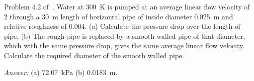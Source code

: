
\begin{question}
	Problem 4.2 of~\cite{gaskell}. Water at \SI{300}{\kelvin} is pumped at an average linear flow velocity of \SI{2}{\mps} through a \SI{30}{\metre} length of horizontal pipe of inside diameter \SI{0.025}{\metre} and relative roughness of $0.004$. (a) Calculate the pressure drop over the length of pipe. (b) The rough pipe is replaced by a smooth walled pipe of that diameter, which with the same pressure drop, gives the same average linear flow velocity. Calculate the required diameter of the smooth walled pipe.
\end{question}
\begin{solution}[print]
{\it Answer:} (a) \SI{72.07}{\kilo\pascal} (b) \SI{0.0183}{\metre}.



\end{solution}


